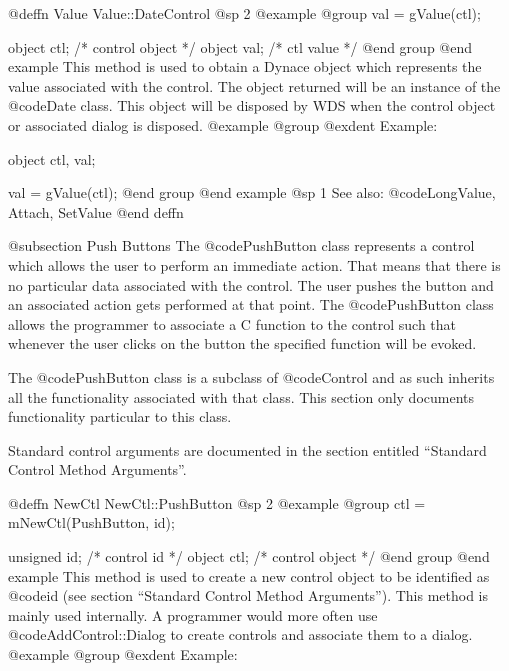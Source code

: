 @deffn {Value} Value::DateControl
@sp 2
@example
@group
val = gValue(ctl);

object  ctl;   /*  control object  */
object  val;   /*  ctl value       */
@end group
@end example
This method is used to obtain a Dynace object which represents the value
associated with the control.  The object returned will be an instance of
the @code{Date} class.  This object will be disposed by WDS when the
control object or associated dialog is disposed.
@example
@group
@exdent Example:

object  ctl, val;

val = gValue(ctl);
@end group
@end example
@sp 1
See also:  @code{LongValue, Attach, SetValue}
@end deffn

















@subsection Push Buttons
The @code{PushButton} class represents a control which allows the user
to perform an immediate action.  That means that there is no particular
data associated with the control.  The user pushes the button and an
associated action gets performed at that point.  The @code{PushButton}
class allows the programmer to associate a C function to the control
such that whenever the user clicks on the button the specified function
will be evoked.

The @code{PushButton} class is a subclass of @code{Control} and as such
inherits all the functionality associated with that class.  This section
only documents functionality particular to this class.

Standard control arguments are documented in the section entitled
``Standard Control Method Arguments''.





@deffn {NewCtl} NewCtl::PushButton
@sp 2
@example
@group
ctl = mNewCtl(PushButton, id);

unsigned  id;   /*  control id      */
object   ctl;   /*  control object  */
@end group
@end example
This method is used to create a new control object to be identified as
@code{id} (see section ``Standard Control Method Arguments'').  This
method is mainly used internally.  A programmer would more often
use @code{AddControl::Dialog} to create controls and associate them
to a dialog.
@example
@group
@exdent Example:

